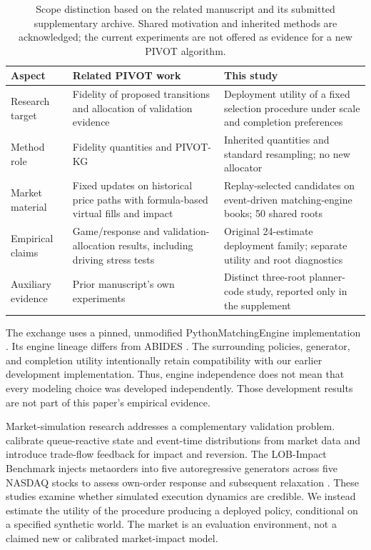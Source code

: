 \documentclass[10pt,letterpaper]{article}
\begin{document}
\begin{table}[t]\centering\small
\begin{tabular}{@{}p{.19\linewidth}p{.35\linewidth}p{.39\linewidth}@{}}\toprule
Aspect & Related PIVOT work & This study\\\midrule
Research target & Fidelity of proposed transitions and allocation of validation evidence & Deployment utility of a fixed selection procedure under scale and completion preferences\\
Method role & Fidelity quantities and PIVOT-KG & Inherited quantities and standard resampling; no new allocator\\
Market material & Fixed updates on historical price paths with formula-based virtual fills and impact & Replay-selected candidates on event-driven matching-engine books; 50 shared roots\\
Empirical claims & Game/response and validation-allocation results, including driving stress tests & Original 24-estimate deployment family; separate utility and root diagnostics\\
Auxiliary evidence & Prior manuscript's own experiments & Distinct three-root planner-code study, reported only in the supplement\\\bottomrule
\end{tabular}
\caption{Scope distinction based on the related manuscript and its submitted supplementary archive. Shared motivation and inherited methods are acknowledged; the current experiments are not offered as evidence for a new PIVOT algorithm.}\label{tab:boundary}
\end{table}

The exchange uses a pinned, unmodified PythonMatchingEngine implementation \citep{pythonmatchingengine}. Its engine lineage differs from ABIDES \citep{byrd2019,amrouni2021}. The surrounding policies, generator, and completion utility intentionally retain compatibility with our earlier development implementation. Thus, engine independence does not mean that every modeling choice was developed independently. Those development results are not part of this paper's empirical evidence.

Market-simulation research addresses a complementary validation problem. \citet{noble2026} calibrate queue-reactive state and event-time distributions from market data and introduce trade-flow feedback for impact and reversion. The LOB-Impact Benchmark injects metaorders into five autoregressive generators across five NASDAQ stocks to assess own-order response and subsequent relaxation \citep{nigmatulin2026}. These studies examine whether simulated execution dynamics are credible. We instead estimate the utility of the procedure producing a deployed policy, conditional on a specified synthetic world. The market is an evaluation environment, not a claimed new or calibrated market-impact model.
\end{document}
